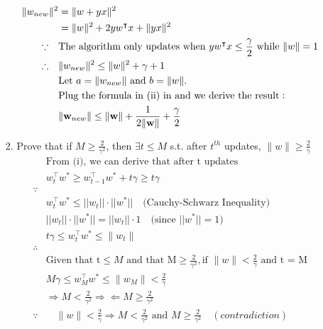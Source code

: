 \documentclass{article}
\theoremstyle{definition}
\theoremstyle{remark}
\begin{document}
\begin{enumerate}[font={\Large\bfseries},left=0pt]
\begin{tcolorbox}
\begin{enumerate}
\begin{enumerate}
            \begin{align}
                \|{w}_{new}\|^2 &= \|w + yx\|^2 \\
                                &= \|w\|^2 + 2yw^\intercal x + \|yx\|^2 \\
                                \because \quad& \text{The algorithm only updates when } yw^\intercal x \le \frac{\gamma}{2} \text{ while } \|w\| = 1 \\
                                \therefore \quad& \|w_{new}\|^2 \le \|w\|^2 + \gamma + 1 \\
                                &\text{Let } a = \|w_{new}\| \text{ and }b = \|w\|.\\ 
                                &\text{Plug the formula in (ii) in and we derive the result}:\\
                                &\|{\bf w}_{new}\|\leq\|{\bf w}\|+\frac{1}{2\|{\bf w}\|}+\frac{\gamma}{2}
            \end{align}
            \item Prove that if $M \ge \frac{2}{\gamma^2}$, then $\exists t \le M$ s.t. after $t^{th}$ updates, $\|w\| \ge \frac{2}{\gamma}$
            \begin{align}
                &\text{From (i), we can derive that after t updates } \\
                &w_t^{\intercal}w^* \ge w_{t-1}^{\intercal}w^* + t\gamma \ge t\gamma\\
                \because \\
                &w_t^{\intercal}w^* \leq ||w_t|| \cdot ||w^*|| \quad \text{(Cauchy-Schwarz Inequality)} \\
                &||w_t|| \cdot ||w^*||= ||w_t|| \cdot 1 \quad \text{(since } ||w^*|| = 1\text{)} \\
                &t\gamma \le w_t^{\intercal}w^* \le \|w_t\| \\
                \therefore  \\
                &\text{Given that t} \le M \text{ and that M} \ge \frac{2}{\gamma^2}, \text{if } \|w\| < \frac{2} {\gamma} \text{ and t = M} \\
                &M\gamma \le w_M^{\intercal}w^* \le \|w_M\| < \frac{2}{\gamma} \\
                &\Rightarrow M < \frac{2}{\gamma^2} \Rightarrow\!\Leftarrow M \ge \frac{2}{\gamma^2} \\
                \because &\quad \|w\| < \frac{2}{\gamma} \Rightarrow M < \frac{2}{\gamma^2} \text{ and } M \ge \frac{2}{\gamma^2}\quad (contradiction) \\

\end{align}
\end{enumerate}
\end{enumerate}
\end{tcolorbox}
\end{enumerate}
\end{document}
